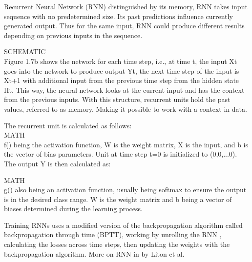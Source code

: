 Recurrent Neural Network (RNN) distinguished by its memory, RNN takes input sequence with no predetermined size.
 Its past predictions influence currently generated output. Thus for the same input,
  RNN could produce different results depending on previous inputs in the sequence.\cite{rnnDSmedium}

SCHEMATIC\\

Figure 1.7b shows the network for each time step, i.e., at time t, the input Xt goes into the network to produce output Yt, the next time step of the input is Xt+1 with additional input from the previous time step from the hidden state Ht. This way, the neural network looks at the current input and has the context from the previous inputs.
With this structure, recurrent units hold the past values, referred to as memory. Making it possible to work with a context in data.
\cite{rnnin6}

The recurrent unit is calculated as follows:\\

MATH\\

f() being the activation function, W is the weight matrix, X is the input, and b is the vector of bias parameters. Unit at time step t=0 is initialized to (0,0,...0). The output Y is then calculated as:

MATH\\

g() also being an activation function, usually being softmax to ensure the output is in the desired class range. W is the weight matrix and b being a vector of biases determined during the learning process.

Training RNNs uses a modified version of the backpropagation algorithm called backpropagation through time (BPTT), working by unrolling the RNN \cite{Goodfellow-et-al-2016}, calculating the losses across time steps,
 then updating the weights with the backpropagation algorithm. More on RNN in \cite{lipton2015critical} by Liton et al.





